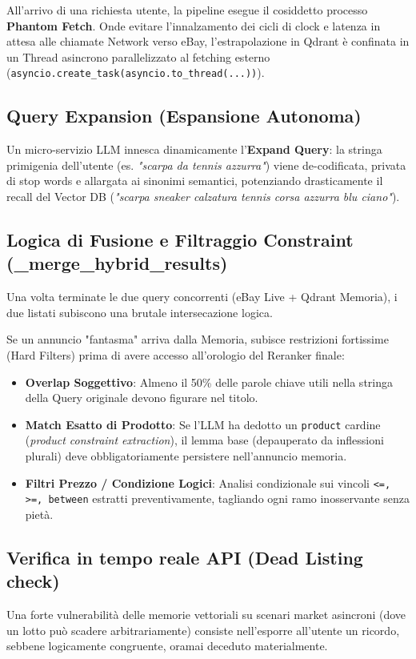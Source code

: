 All'arrivo di una richiesta utente, la pipeline esegue il cosiddetto processo \textbf{Phantom Fetch}. Onde evitare l'innalzamento dei cicli di clock e latenza in attesa alle chiamate Network verso eBay, l'estrapolazione in Qdrant è confinata in un Thread asincrono parallelizzato al fetching esterno (\texttt{asyncio.create\_task(asyncio.to\_thread(...))}).

\subsection{Query Expansion (Espansione Autonoma)}
Un micro-servizio LLM innesca dinamicamente l'\textbf{Expand Query}: la stringa primigenia dell'utente (es. \textit{"scarpa da tennis azzurra"}) viene de-codificata, privata di stop words e allargata ai sinonimi semantici, potenziando drasticamente il recall del Vector DB (\textit{"scarpa sneaker calzatura tennis corsa azzurra blu ciano"}).

\subsection{Logica di Fusione e Filtraggio Constraint (\_merge\_hybrid\_results)}
Una volta terminate le due query concorrenti (eBay Live + Qdrant Memoria), i due listati subiscono una brutale intersecazione logica.

Se un annuncio "fantasma" arriva dalla Memoria, subisce restrizioni fortissime (Hard Filters) prima di avere accesso all'orologio del Reranker finale:
\begin{itemize}
    \item \textbf{Overlap Soggettivo}: Almeno il 50\% delle parole chiave utili nella stringa della Query originale devono figurare nel titolo.
    \item \textbf{Match Esatto di Prodotto}: Se l'LLM ha dedotto un \texttt{product} cardine (\textit{product constraint extraction}), il lemma base (depauperato da inflessioni plurali) deve obbligatoriamente persistere nell'annuncio memoria.
    \item \textbf{Filtri Prezzo / Condizione Logici}: Analisi condizionale sui vincoli \texttt{<=, >=, between} estratti preventivamente, tagliando ogni ramo inosservante senza pietà.
\end{itemize}

\subsection{Verifica in tempo reale API (Dead Listing check)}
\label{subsec:rag-validation}
Una forte vulnerabilità delle memorie vettoriali su scenari market asincroni (dove un lotto può scadere arbitrariamente) consiste nell'esporre all'utente un ricordo, sebbene logicamente congruente, oramai deceduto materialmente.

